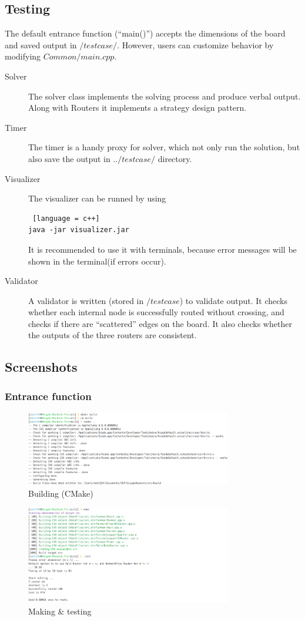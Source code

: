 \documentclass{article}
\begin{document}
\begin{spacing}{1.1}
    \subsection{Testing}
    The default entrance function (``main()'') accepts the dimensions of the board and saved output in $/testcase/$. However, users can customize behavior by modifying $Common/main.cpp$.
    \begin{description}
        \item [Solver] The solver class implements the solving process and produce verbal output. Along with Routers it implements a strategy design pattern.
        \item [Timer] The timer is a handy proxy for solver, which not only run the solution, but also save the output in $../testcase/$ directory.
        \item [Visualizer] The visualizer can be runned by using
        \begin{lstlisting} [language = c++]
java -jar visualizer.jar\end{lstlisting}
        It is recommended to use it with terminals, because error messages will be shown in the terminal(if errors occur).
        \item [Validator] A validator is written (stored in $/testcase$) to validate output. It checks whether each internal node is successfully routed without crossing, and checks if there are ``scattered'' edges on the board.
        It also checks whether the outputs of the three routers are consistent.
    \end{description}
    \subsection{Screenshots}
    \subsubsection{Entrance function}
    \begin{figure}[H]
        \includegraphics[width = 0.8\textwidth]{test0.png}
        \caption{Building (CMake)}
    \end{figure}
    \begin{figure}[H]
        \includegraphics[width = 0.8\textwidth]{test1.png}
        \caption{Making \& testing}
    \end{figure}

\end{spacing}
\end{document}
